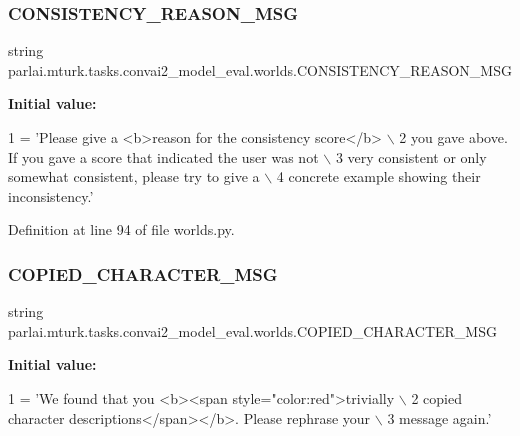\subsubsection{\texorpdfstring{C\+O\+N\+S\+I\+S\+T\+E\+N\+C\+Y\+\_\+\+R\+E\+A\+S\+O\+N\+\_\+\+M\+SG}{CONSISTENCY\_REASON\_MSG}}
{\footnotesize\ttfamily string parlai.\+mturk.\+tasks.\+convai2\+\_\+model\+\_\+eval.\+worlds.\+C\+O\+N\+S\+I\+S\+T\+E\+N\+C\+Y\+\_\+\+R\+E\+A\+S\+O\+N\+\_\+\+M\+SG}

{\bfseries Initial value\+:}
\begin{DoxyCode}
1 =  \textcolor{stringliteral}{'Please give a <b>reason for the consistency score</b> \(\backslash\)}
2 \textcolor{stringliteral}{        you gave above. If you gave a score that indicated the user was not \(\backslash\)}
3 \textcolor{stringliteral}{        very consistent or only somewhat consistent, please try to give a \(\backslash\)}
4 \textcolor{stringliteral}{        concrete example showing their inconsistency.'}
\end{DoxyCode}


Definition at line 94 of file worlds.\+py.

\mbox{\label{namespaceparlai_1_1mturk_1_1tasks_1_1convai2__model__eval_1_1worlds_afa9aa1d2e030a612c4009ab01459d932}} 
\subsubsection{\texorpdfstring{C\+O\+P\+I\+E\+D\+\_\+\+C\+H\+A\+R\+A\+C\+T\+E\+R\+\_\+\+M\+SG}{COPIED\_CHARACTER\_MSG}}
{\footnotesize\ttfamily string parlai.\+mturk.\+tasks.\+convai2\+\_\+model\+\_\+eval.\+worlds.\+C\+O\+P\+I\+E\+D\+\_\+\+C\+H\+A\+R\+A\+C\+T\+E\+R\+\_\+\+M\+SG}

{\bfseries Initial value\+:}
\begin{DoxyCode}
1 =  \textcolor{stringliteral}{'We found that you <b><span style="color:red">trivially \(\backslash\)}
2 \textcolor{stringliteral}{        copied character descriptions</span></b>. Please rephrase your \(\backslash\)}
3 \textcolor{stringliteral}{        message again.'}
\end{DoxyCode}


